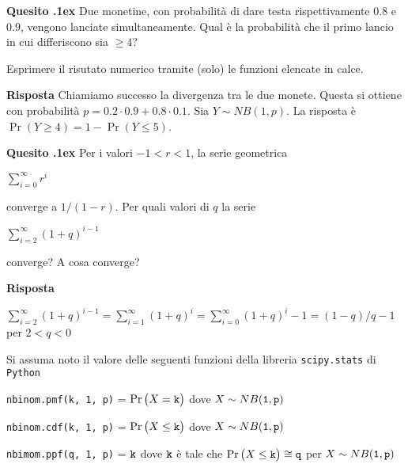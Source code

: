 \documentclass[11pt,twoside,a4paper]{article}
\newcounter{quesito}
\newenvironment{question}{\addtocounter{quesito}{1}\par\textbf{Quesito \thequesito.\kern1ex}}{\vspace{0.5\parskip}}
\newenvironment{answer}{\par\textbf{Risposta\quad}}{\vspace{\parskip}}
\begin{document}
\begin{question}
Due monetine, con probabilità di dare testa rispettivamente $0.8$ e $0.9$, vengono lanciate simultaneamente. Qual è la probabilità che il primo lancio in cui differiscono sia $\ge 4$? 

Esprimere il risutato numerico tramite (solo) le funzioni elencate in calce.
\begin{answer}
Chiamiamo successo la divergenza tra le due monete. Questa si ottiene con probabilità $p=0.2\cdot0.9+0.8\cdot0.1$. Sia $Y\sim NB(1,p)$. La risposta è $\Pr(Y\ge 4)=1-\Pr(Y\le 5)$.
\end{answer}
\end{question}

\begin{question} Per i valori $-1<r<1$, la serie geometrica 

\hfil$\displaystyle \sum^\infty_{i=0}r^i$ 

converge a $1/(1-r)$. Per quali valori di $q$ la serie 

\hfil$\displaystyle \sum^\infty_{i=2}(1+q)^{i-1}$

converge? A cosa converge?
\begin{answer}

$\displaystyle \sum^\infty_{i=2}(1+q)^{i-1}=\sum^\infty_{i=1}(1+q)^{i}=\sum^\infty_{i=0}(1+q)^{i}-1=(1-q)/q -1$ per $2<q<0$

\end{answer}
\end{question}



\vfill
\hrulefill

Si assuma noto il valore delle seguenti funzioni della libreria {\tt scipy.stats\/} di  {\tt Python\/}

{\tt nbinom.pmf(k, 1, p)} = $\Pr\big(X={\tt k}\big)$ dove $X\sim NB({\tt 1},{\tt p})$ 

{\tt nbinom.cdf(k, 1, p)} = $\Pr\big(X\le{\tt k}\big)$ dove  $X\sim NB({\tt 1},{\tt p})$ 

{\tt nbimom.ppf(q, 1, p)} = ${\tt k}$ dove ${\tt k}$ è tale che $\Pr\big(X\le{\tt k}\big)\cong{\tt q}$ per $X\sim NB({\tt 1},{\tt p})$ 
\end{document}
